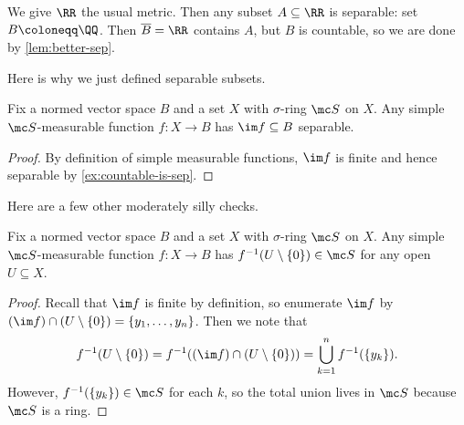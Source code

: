 \documentclass[../notes.tex]{subfiles}
\begin{document}
\begin{example} \label{ex:all-sep-in-r}
	We give $\RR$ the usual metric. Then any subset $A\subseteq\RR$ is separable: set $B\coloneqq\QQ$. Then $\overline B=\RR$ contains $A$, but $B$ is countable, so we are done by \autoref{lem:better-sep}.
\end{example}
Here is why we just defined separable subsets.
\begin{lemma} \label{lem:simple-has-sep-image}
	Fix a normed vector space $B$ and a set $X$ with $\sigma$-ring $\mc S$ on $X$. Any simple $\mc S$-measurable function $f\colon X\to B$ has $\im f\subseteq B$ separable.
\end{lemma}
\begin{proof}
	By definition of simple measurable functions, $\im f$ is finite and hence separable by \autoref{ex:countable-is-sep}.
\end{proof}
Here are a few other moderately silly checks.
\begin{lemma} \label{lem:simple-measurable-pre-image}
	Fix a normed vector space $B$ and a set $X$ with $\sigma$-ring $\mc S$ on $X$. Any simple $\mc S$-measurable function $f\colon X\to B$ has $f^{-1}(U\setminus\{0\})\in\mc S$ for any open $U\subseteq X$.
\end{lemma}
\begin{proof}
	Recall that $\im f$ is finite by definition, so enumerate $\im f$ by $(\im f)\cap(U\setminus\{0\})=\{y_1,\ldots,y_n\}$. Then we note that
	\[f^{-1}(U\setminus\{0\})=f^{-1}((\im f)\cap(U\setminus\{0\}))=\bigcup_{k=1}^nf^{-1}(\{y_k\}).\]
	However, $f^{-1}(\{y_k\})\in\mc S$ for each $k$, so the total union lives in $\mc S$ because $\mc S$ is a ring.
\end{proof}
\end{document}
